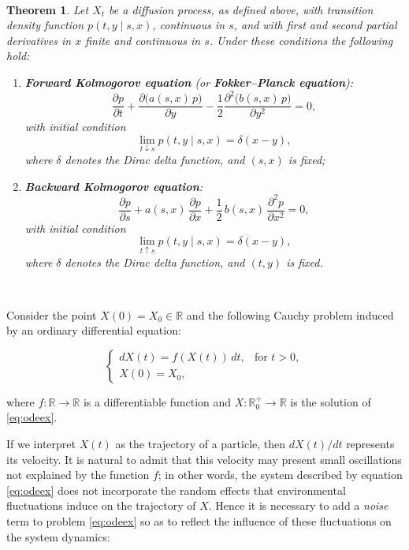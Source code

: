 \documentclass[
  11pt,
  a4paper,
]{book}
\newtheorem{theorem}{Theorem}[chapter]
\theoremstyle{definition}
\theoremstyle{definition}
\theoremstyle{definition}
\theoremstyle{definition}
\theoremstyle{remark}
\begin{document}
\(\,\)

\begin{theorem}

Let \(X_t\) be a diffusion process, as defined above, with transition density function \(p(t, y \mid s, x)\), continuous in \(s\), and with first and second partial derivatives in \(x\) finite and continuous in \(s\). Under these conditions the following hold:

\begin{enumerate}
\def\labelenumi{\arabic{enumi}.}
\item
  \textbf{Forward Kolmogorov equation} (or \textbf{Fokker--Planck equation}):
  \[
  \frac{\partial p}{\partial t} + \frac{\partial\big(a(s,x)\,p\big)}{\partial y} - \frac{1}{2} \frac{\partial^2\big(b(s,x)\,p\big)}{\partial y^2} = 0,
  \]
  with initial condition
  \[
  \lim_{t \downarrow s} p(t, y \mid s, x) = \delta(x - y),
  \]
  where \(\delta\) denotes the Dirac delta function, and \((s, x)\) is fixed;
\item
  \textbf{Backward Kolmogorov equation}:
  \[
  \frac{\partial p}{\partial s} + a(s,x)\,\frac{\partial p}{\partial x} + \frac{1}{2}\,b(s,x)\,\frac{\partial^2 p}{\partial x^2} = 0,
  \]
  with initial condition
  \[
  \lim_{t \uparrow s} p(t, y \mid s, x) = \delta(x - y),
  \]
  where \(\delta\) denotes the Dirac delta function, and \((t, y)\) is fixed.
\end{enumerate}

\end{theorem}

\(\,\)

Consider the point \(X(0)=X_0\in\mathbb{R}\) and the following Cauchy problem induced by an ordinary differential equation:

\begin{equation}
\label{eq:odeex}
\begin{cases}
dX(t)=f(X(t))\,dt, & \text{for } t>0,\\
X(0)=X_0,
\end{cases}
\end{equation}

where \(f:\mathbb{R}\to\mathbb{R}\) is a differentiable function and \(X:\mathbb{R}_0^+\to\mathbb{R}\) is the solution of \eqref{eq:odeex}.

If we interpret \(X(t)\) as the trajectory of a particle, then \(dX(t)/dt\) represents its velocity. It is natural to admit that this velocity may present small oscillations not explained by the function \(f\); in other words, the system described by equation \eqref{eq:odeex} does not incorporate the random effects that environmental fluctuations induce on the trajectory of \(X\). Hence it is necessary to add a \emph{noise} term to problem \eqref{eq:odeex} so as to reflect the influence of these fluctuations on the system dynamics:
\end{document}
